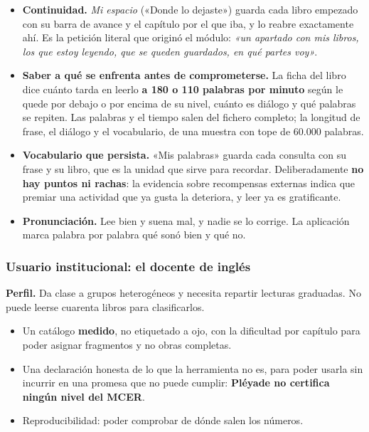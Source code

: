 \documentclass[11pt,a4paper]{article}
\begin{document}
\begin{itemize}[leftmargin=*, itemsep=3pt]
  \item \textbf{Continuidad.} \emph{Mi espacio} («Donde lo dejaste») guarda cada libro empezado con su barra de
        avance y el capítulo por el que iba, y lo reabre exactamente ahí. Es la
        petición literal que originó el módulo: \emph{«un apartado con mis libros, los
        que estoy leyendo, que se queden guardados, en qué partes voy»}.
  \item \textbf{Saber a qué se enfrenta antes de comprometerse.} La ficha del libro dice
        cuánto tarda en leerlo \textbf{a 180 o 110 palabras por minuto} según le quede por
        debajo o por encima de su nivel, cuánto es diálogo y qué palabras se
        repiten. Las palabras y el tiempo salen del fichero completo; la longitud de frase,
        el diálogo y el vocabulario, de una muestra con tope de 60.000 palabras.
  \item \textbf{Vocabulario que persista.} «Mis palabras» guarda cada consulta con su
        frase y su libro, que es la unidad que sirve para recordar. Deliberadamente
        \textbf{no hay puntos ni rachas}: la evidencia sobre recompensas externas
        \parencite{deci1999meta} indica que premiar una actividad que ya gusta la
        deteriora, y leer ya es gratificante.
  \item \textbf{Pronunciación.} Lee bien y suena mal, y nadie se lo corrige. La
        aplicación marca palabra por palabra qué sonó bien y qué no.
\end{itemize}

\subsubsection{Usuario institucional: el docente de inglés}
\label{sec:usuario-docente}

\textbf{Perfil.} Da clase a grupos heterogéneos y necesita repartir lecturas graduadas.
No puede leerse cuarenta libros para clasificarlos.

\begin{itemize}[leftmargin=*, itemsep=3pt]
  \item Un catálogo \textbf{medido}, no etiquetado a ojo, con la dificultad por capítulo
        para poder asignar fragmentos y no obras completas.
  \item Una declaración honesta de lo que la herramienta no es, para poder usarla sin
        incurrir en una promesa que no puede cumplir: \textbf{Pléyade no certifica
        ningún nivel del MCER}.
  \item Reproducibilidad: poder comprobar de dónde salen los números.
\end{itemize}
\end{document}

